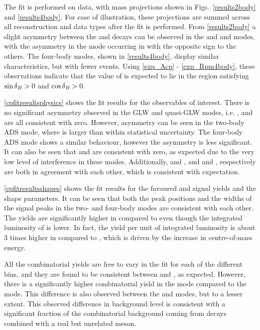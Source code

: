 The \CP fit is performed on data, with mass projections shown in Figs.~\ref{results2body} and \ref{results4body}. For ease of illustration, these projections are summed across all \KS reconstruction and data types after the fit is performed. From \fig\ref{results2body} a slight asymmetry between the \Bp and \Bm decays can be observed in the \kk and \pipi and \pik modes, with the asymmetry in the \pik mode occurring in with the opposite sign to the others. The four-body modes, shown in \fig\ref{results4body}, display similar characteristics, but with fewer events. Using \eqns\ref{exp_Acp} - \ref{exp_Rpm4body}, these observations indicate that the value of \deltab is expected to lie in the region satisfying $\sin\delta_B > 0$ and $\cos\delta_B >0$. 

\Tab\ref{cpfitresultsphysics} shows the \CP fit results for the \CP observables of interest. There is no significant asymmetry observed in the GLW and quasi-GLW modes, i.e. \Akk, \Apipi and \Apipipipi are all consistent with zero. However, asymmetry can be seen in the two-body ADS mode, where \Rptwo is larger than \Rmtwo within statistical uncertainty. The four-body ADS mode shows a similar behaviour, however the asymmetry is less significant. It can also be seen that \Akpi and \Akpipipi are consistent with zero, as expected due to the very low level of interference in these modes. Additionally, \Akk and \Apipi, and \Rkk and \Rpipi, respectively are both in agreement with each other, which is consistent with expectation.

\Tab\ref{cpfitresultsshapes} shows the fit results for the favoured \kpi and \kpipipi signal yields and the shape parameters. It can be seen that both the peak positions and the widths of the signal peaks in the two- and four-body modes are consistent with each other. The yields are significantly higher in \runtwo compared to \runone even though the integrated luminosity of \runtwo is lower. In fact, the yield per unit of integrated luminosity is about 3 times higher in \runtwo compared to \runone, which is driven by the increase in \runtwo centre-of-mass energy. 

All the combinatorial yields are free to vary in the \CP fit for each of the different bins, and they are found to be consistent between \Bm and \Bp, as expected. However, there is a significantly higher combinatorial yield in the \kpi mode compared to the \pik mode. This difference is also observed between the \kpipipi and \pikpipi modes, but to a lesser extent. This observed difference in background level is consistent with a significant fraction of the combinatorial background coming from  decays combined with a real but unrelated \KS meson. 

